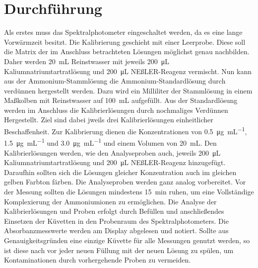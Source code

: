 \section{Durchführung}
\label{sec:durchfuerung}
Als erstes muss das Spektralphotometer eingeschaltet werden, da es eine lange Vorwärmzeit besitzt. Die Kalibrierung geschieht mit einer Leerprobe. Diese soll die Matrix der im Anschluss betrachteten Lösungen möglichst genau nachbilden. Daher werden \SI{20}{\milli\liter} Reinstwasser mit jeweils \SI{200}{\micro\liter} Kaliumnatriumtartratlösung und \SI{200}{\micro\liter} NEßLER-Reagenz vermischt. Nun kann aus der Ammonium-Stammlösung die Ammonium-Standardlösung durch verdünnen hergestellt werden. Dazu wird ein Milliliter der Stammlösung in einem Maßkolben mit Reinstwasser auf \SI{100}{\milli\liter} aufgefüllt. Aus der Standardlösung werden im Anschluss die Kalibrierlösungen durch nochmaliges Verdünnen Hergestellt. Ziel sind dabei jweils drei Kalibrierlösungen einheitlicher Beschaffenheit. Zur Kalibrierung dienen die Konzentrationen von \SI{0,5}{\micro\gram\per\milli\liter}, \SI{1,5}{\micro\gram\per\milli\liter} und \SI{3,0}{\micro\gram\per\milli\liter} und einem Volumen von \SI{20}{\milli\liter}. Den Kalibrierlösungen werden, wie den Analyseproben auch, jeweils \SI{200}{\micro\liter} Kaliumnatriumtartratlösung und \SI{200}{\micro\liter} NEßLER-Reagenz hinzugefügt. Daraufhin sollten sich die Lösungen gleicher Konzentration auch im gleichen gelben Farbton färben. Die Analyseproben werden ganz analog vorbereitet. Vor der Messung sollten die Lösungen mindestens \SI{15}{\minute} ruhen, um eine Vollständige Komplexierung der Ammoniumionen zu ermöglichen. Die Analyse der Kalibrierlösungen und Proben erfolgt durch Befüllen und anschließendes Einsetzen der Küvetten in den Probenraum des Spektralphotometers. Die Absorbanzmesswerte werden am Display abgelesen und notiert. 
Sollte aus Genauigkeitsgründen eine einzige Küvette für alle Messungen genutzt werden, so ist diese nach vor jeder neuen Füllung mit der neuen Lösung zu spülen, um Kontaminationen durch vorhergehende Proben zu vermeiden.